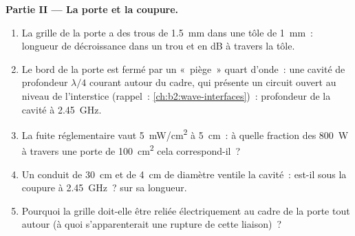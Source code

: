 \begin{problem}
\medskip
\noindent\textbf{Partie II --- La porte et la coupure.}
\begin{enumerate}[resume]
  \item La grille de la porte a des trous de \qty{1.5}{mm} dans une tôle de \qty{1}{mm}~: longueur
        de décroissance dans un trou et  en dB à travers la tôle.
  \item Le bord de la porte est fermé par un «~piège~» quart d'onde~: une cavité
        de profondeur $\lambda/4$ courant autour du cadre, qui présente un circuit
        ouvert au niveau de l'interstice (rappel~: \cref{ch:b2:wave-interfaces})~: profondeur
        de la cavité à \qty{2.45}{GHz}.
  \item La fuite réglementaire vaut \qty{5}{mW/cm^2} à \qty{5}{cm}~: à quelle fraction des
        \qty{800}{W} à travers une porte de \qty{100}{cm^2} cela correspond-il~?
  \item Un conduit de \qty{30}{cm} et de \qty{4}{cm} de diamètre ventile la cavité~: est-il
        sous la coupure à \qty{2.45}{GHz}~?  sur sa longueur.
  \item Pourquoi la grille doit-elle être reliée électriquement au cadre de la porte tout
        autour (à quoi s'apparenterait une rupture de cette liaison)~?
\end{enumerate}


\end{problem}
